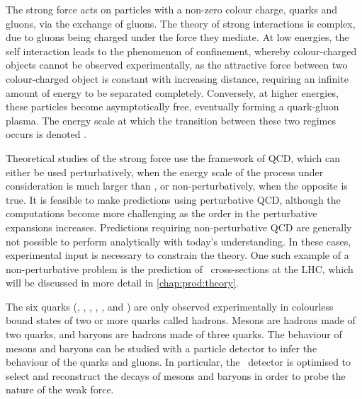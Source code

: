 The strong force acts on particles with a non-zero colour charge, quarks and gluons, via the 
exchange of gluons.
The theory of strong interactions is complex, due to gluons being charged under 
the force they mediate.
At low energies, the self interaction leads to the phenomenon of confinement, 
whereby colour-charged objects cannot be observed experimentally, as the 
attractive force between two colour-charged object is constant with increasing 
distance, requiring an infinite amount of energy to be separated completely.
Conversely, at higher energies, these particles become asymptotically free, 
eventually forming a quark-gluon plasma.
The energy scale at which the transition between these two regimes occurs is 
denoted \qcdscale.

Theoretical studies of the strong force use the framework of \ac{QCD}, which 
can either be used perturbatively, when the energy scale of the process under 
consideration is much larger than \qcdscale, or non-perturbatively, when the 
opposite is true.
It is feasible to make predictions using perturbative \ac{QCD}, although the 
computations become more challenging as the order in the perturbative 
expansions increases.
Predictions requiring non-perturbative \ac{QCD} are generally not possible to 
perform analytically with today's understanding.
In these cases, experimental input is necessary to constrain the theory.
One such example of a non-perturbative problem is the prediction of \pp\ 
cross-sections at the \ac{LHC}, which will be discussed in more detail in 
\cref{chap:prod:theory}.

The six quarks (\Pup, \Pdown, \Pcharm, \Pstrange, \Ptop, and \Pbottom) are only 
observed experimentally in colourless bound states of two or more quarks called 
hadrons.
Mesons are hadrons made of two quarks, and baryons are hadrons made of three 
quarks.
The behaviour of mesons and baryons can be studied with a particle detector to 
infer the behaviour of the quarks and gluons.
In particular, the \lhcb\ detector is optimised to select and reconstruct the 
decays of mesons and baryons in order to probe the nature of the weak force.


